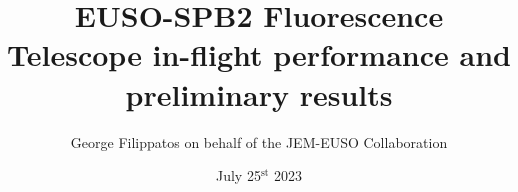 \documentclass[aspectratio=169]{beamer}
\title[38$^{\text{th}}$ International Cosmic Ray Conference, Nagoya Japan]{EUSO-SPB2 Fluorescence Telescope in-flight performance and preliminary results }
\author[G. Filippatos]{George Filippatos on behalf of the JEM-EUSO Collaboration}
\institute[Colorado School of Mines]{Colorado School of Mines}
\date[25 Jul 2023]{July 25$^{\text{st}}$ 2023}
\begin{document}
\begin{frame}
\titlepage
\end{frame}

%  
%  
\end{document}
